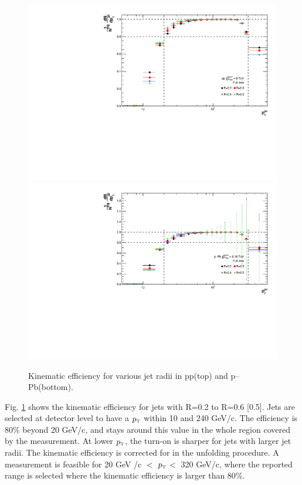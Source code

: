 \documentclass[ALICE]{ALICE_analysis_notes}
\newcommand{\pT}{$p_{\mbox{\tiny T}}$\xspace}
\newcommand{\pPb}{{\mbox{p--Pb}}\xspace}
\newcommand{\pp}{pp\xspace}
\begin{document}
\begin{figure}
    \centering
    \includegraphics[width=15cm]{figures/KinematicEfficiency/EffKine.pdf}
    \includegraphics[width=15cm]{figures/pPbFigures/KinematicEfficiency/EffKine.pdf}
    \caption{Kinematic efficiency for various jet radii in \pp (top) and \pPb (bottom).}
    \label{fig:KinematicEfficiency}
\end{figure}

Fig. \ref{fig:KinematicEfficiency} shows the kinematic efficiency for jets with R=0.2 to R=0.6 [0.5]. Jets are selected at detector level to have a \pT within 10 and 240 GeV/c. The efficiency is 80$\%$ beyond 20 GeV/c, and stays around this value in the whole region covered by the measurement. At lower \pT, the turn-on is sharper for jets with larger jet radii. The kinematic efficiency is corrected for in the unfolding procedure. A measurement is feasible for 20 GeV /c $<$ \pT $<$ 320 GeV/c, where the reported range is selected where the kinematic efficiency is larger than 80$\%$.
\end{document}
